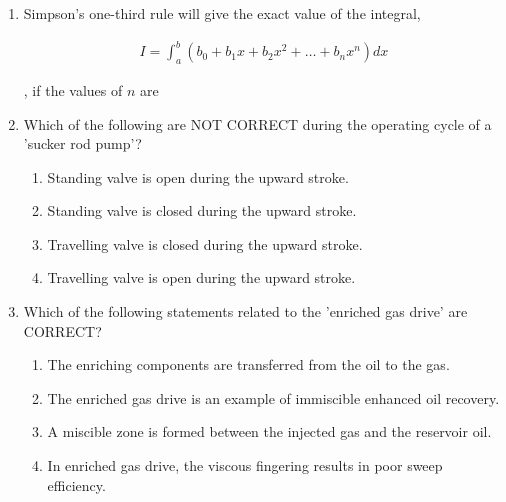 \documentclass[journal,12pt,onecolumn]{IEEEtran}
\theoremstyle{remark}
\begin{document}
\begin{enumerate}
\item Simpson's one-third rule will give the exact value of the integral,  

\begin{align*}
I = \int_a^b \left( b_0 + b_1 x + b_2 x^2 + \dots + b_n x^n \right) dx
\end{align*}

, if the values of $n$ are

\hfill{}

\begin{enumerate}
\end{enumerate}

\item Which of the following are NOT CORRECT during the operating cycle of a 'sucker rod pump'?

\hfill{}

\begin{enumerate}
\item Standing valve is open during the upward stroke.
\item Standing valve is closed during the upward stroke.
\item Travelling valve is closed during the upward stroke.
\item Travelling valve is open during the upward stroke.
\end{enumerate}

\item Which of the following statements related to the 'enriched gas drive' are CORRECT?

\hfill{}

\begin{enumerate}
\item The enriching components are transferred from the oil to the gas.
\item The enriched gas drive is an example of immiscible enhanced oil recovery.
\item A miscible zone is formed between the injected gas and the reservoir oil.
\item In enriched gas drive, the viscous fingering results in poor sweep efficiency.
\end{enumerate}


\end{enumerate}
\end{document}
